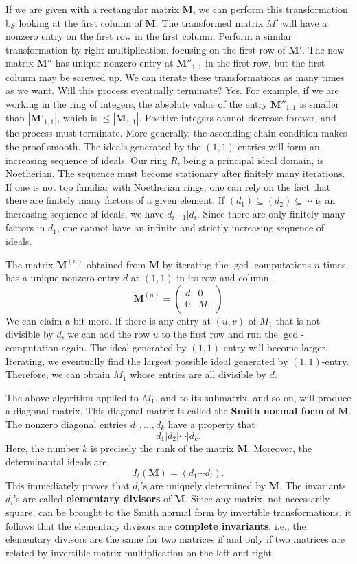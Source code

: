 If we are given with a rectangular matrix $\mathbf M$,
we can perform this transformation by looking at the first column of $\mathbf M$.
The transformed matrix $M'$ will have a nonzero entry on the first row in the first column.
Perform a similar transformation by right multiplication, focusing on the first row of $\mathbf M'$.
The new matrix $\mathbf M''$ has unique nonzero entry at $\mathbf M''_{1,1}$ in the first row,
but the first column may be screwed up.
We can iterate these transformations as many times as we want.
Will this process eventually terminate? Yes.
For example, if we are working in the ring of integers,
the absolute value of the entry $\mathbf M''_{1,1}$ is smaller than $|\mathbf M'_{1,1}|$, which is $\le |\mathbf M_{1,1}|$.
Positive integers cannot decrease forever, and the process must terminate.
More generally, the ascending chain condition makes the proof smooth.
The ideals generated by the $(1,1)$-entries will form an increasing sequence of ideals.
Our ring $R$, being a principal ideal domain, is Noetherian.
The sequence must become stationary after finitely many iterations.
If one is not too familiar with Noetherian rings,
one can rely on the fact that there are finitely many factors of a given element.
If $(d_1) \subseteq (d_2) \subseteq \cdots$ is an increasing sequence of ideals,
we have $d_{i+1} | d_{i}$. Since there are only finitely many factors in $d_1$,
one cannot have an infinite and strictly increasing sequence of ideals.

The matrix $\mathbf M^{(n)}$ obtained from $\mathbf M$ by iterating
the $\gcd$-computations $n$-times, has a unique nonzero entry $d$ at $(1,1)$
in its row and column.
\[
\mathbf M^{(n)} = \begin{pmatrix} d & 0 \\ 0 & M_1 \end{pmatrix}
\]
We can claim a bit more. If there is any entry at $(u,v)$ of $M_1$ that is not divisible by $d$,
we can add the row $u$ to the first row and run the $\gcd$-computation again.
The ideal generated by $(1,1)$-entry will become larger.
Iterating, we eventually find the largest possible ideal generated by $(1,1)$-entry.
Therefore, we can obtain $M_1$ whose entries are all divisible by $d$.

The above algorithm applied to $M_1$, and to its submatrix, and so on,
will produce a diagonal matrix. This diagonal matrix is called the {\bf Smith normal form} of $\mathbf M$.
The nonzero diagonal entries $d_1, \ldots, d_k$ have a property that
\[
d_1 | d_2 | \cdots | d_k .
\]
Here, the number $k$ is precisely the rank of the matrix $\mathbf M$.
Moreover, the determinantal ideals are 
\[
I_t ( \mathbf M ) = (d_1 \cdots d_t).
\]
This immediately proves that $d_i$'s are uniquely determined by $\mathbf M$.
The invariants $d_i$'s are called {\bf elementary divisors} of $\mathbf M$.
Since any matrix, not necessarily square, can be brought to the Smith normal form
by invertible transformations,
it follows that the elementary divisors are {\bf complete invariants},
i.e., the elementary divisors are the same for two matrices if and only if two matrices are related by
invertible matrix multiplication on the left and right.



